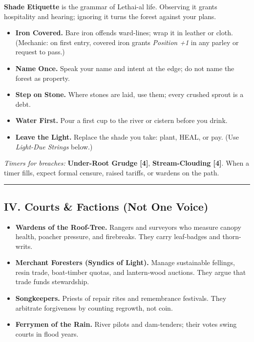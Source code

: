 \documentclass[11pt]{article}
\begin{document}
\textbf{Shade Etiquette} is the grammar of Lethai-al life. Observing it grants hospitality and hearing; ignoring it turns the forest against your plans.

\begin{itemize}[leftmargin=*]
  \item \textbf{Iron Covered.} Bare iron offends ward-lines; wrap it in leather or cloth. (Mechanic: on first entry, covered iron grants \emph{Position +1} in any parley or request to pass.)
  \item \textbf{Name Once.} Speak your name and intent at the edge; do not name the forest as property.
  \item \textbf{Step on Stone.} Where stones are laid, use them; every crushed sprout is a debt.
  \item \textbf{Water First.} Pour a first cup to the river or cistern before you drink.
  \item \textbf{Leave the Light.} Replace the shade you take: plant, HEAL, or pay. (Use \emph{Light-Due Strings} below.)
\end{itemize}

\textit{Timers for breaches:} \textbf{Under-Root Grudge [4]}, \textbf{Stream-Clouding [4]}. When a timer fills, expect formal censure, raised tariffs, or wardens on the path.

\medskip\hrule\medskip

\subsection{IV. Courts \& Factions (Not One Voice)}

\begin{itemize}[leftmargin=*]
  \item \textbf{Wardens of the Roof-Tree.} Rangers and surveyors who measure canopy health, poacher pressure, and firebreaks. They carry leaf-badges and thorn-writs.
  \item \textbf{Merchant Foresters (Syndics of Light).} Manage sustainable fellings, resin trade, boat-timber quotas, and lantern-wood auctions. They argue that trade funds stewardship.
  \item \textbf{Songkeepers.} Priests of repair rites and remembrance festivals. They arbitrate forgiveness by counting regrowth, not coin.
  \item \textbf{Ferrymen of the Rain.} River pilots and dam-tenders; their votes swing courts in flood years.
\end{itemize}
\end{document}
